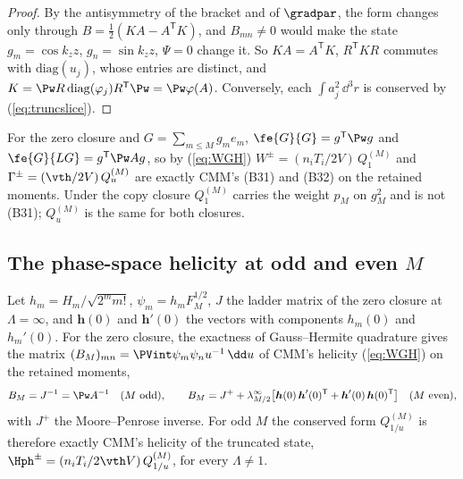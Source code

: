 \begin{proof}
By the antisymmetry of the bracket and of $\gradpar$, the form changes only through $B=\frac12(KA-A^{\mathsf T}K)$, and $B_{mn}\neq0$ would make the state $g_m=\cos k_zz$, $g_n=\sin k_zz$, $\Psi=0$ change it. So $KA=A^{\mathsf T}K$, $R^{\mathsf T}KR$ commutes with $\mathrm{diag}(u_j)$, whose entries are distinct, and $K=\Pw R\,\mathrm{diag}(\varphi_j)R^{\mathsf T}\Pw=\Pw\varphi(A)$. Conversely, each $\int a_j^2\,\dd^3r$ is conserved by (\ref{eq:truncslice}).
\end{proof}

For the zero closure and $G=\sum_{m\le M}g_me_m$, $\fe{G}{G}=g^{\mathsf T}\Pw g$ and $\fe{G}{LG}=g^{\mathsf T}\Pw Ag$, so by (\ref{eq:WGH}) $W^\pm=(n_iT_i/2V)\,Q^{(M)}_1$ and $\Gamma^\pm=(\vth/2V)\,Q^{(M)}_u$ are exactly CMM's (B31) and (B32) on the retained moments. Under the copy closure $Q^{(M)}_1$ carries the weight $p_M$ on $g_M^2$ and is not (B31); $Q^{(M)}_u$ is the same for both closures.

\subsection{The phase-space helicity at odd and even \texorpdfstring{$M$}{M}}

Let $h_m=H_m/\sqrt{2^mm!}$, $\psi_m=h_mF_M^{1/2}$, $J$ the ladder matrix of the zero closure at $\Lambda=\infty$, and $\boldsymbol h(0)$ and $\boldsymbol h'(0)$ the vectors with components $h_m(0)$ and $h_m'(0)$. For the zero closure, the exactness of Gauss--Hermite quadrature gives the matrix $(B_M)_{mn}=\PVint\psi_m\psi_nu^{-1}\,\dd u$ of CMM's helicity (\ref{eq:WGH}) on the retained moments,
\begin{equation}\label{eq:Hoddeven}
  B_M=J^{-1}=\Pw A^{-1}\quad(M\ \text{odd}),\qquad
  B_M=J^{+}+\lambda^\infty_{M/2}\big[\boldsymbol h(0)\,\boldsymbol h'(0)^{\mathsf T}+\boldsymbol h'(0)\,\boldsymbol h(0)^{\mathsf T}\big]\quad(M\ \text{even}),
\end{equation}
with $J^+$ the Moore--Penrose inverse. For odd $M$ the conserved form $Q^{(M)}_{1/u}$ is therefore exactly CMM's helicity of the truncated state, $\Hph^\pm=(n_iT_i/2\vth V)\,Q^{(M)}_{1/u}$, for every $\Lambda\neq1$.

